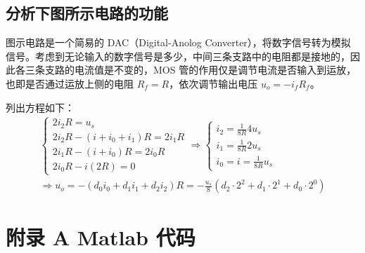 \documentclass[UTF8]{report}
\theoremstyle{MyLineTheoremStyle} %
\theoremstyle{MyBlockTheoremStyle} %
\theoremstyle{MySubsubsectionStyle} %
\begin{document}
\section{分析下图所示电路的功能}
图示电路是一个简易的 DAC（Digital-Anolog Converter），将数字信号转为模拟信号。考虑到无论输入的数字信号是多少，中间三条支路中的电阻都是接地的，因此各三条支路的电流值是不变的，MOS 管的作用仅是调节电流是否输入到运放，也即是否通过运放上侧的电阻 $R_f = R$，依次调节输出电压 $u_o = -i_fR_f$。

列出方程如下：
\begin{gather}
\begin{cases}
    2i_2R = u_s \\ 
    2i_2R - (i + i_0 + i_1)R = 2i_1R \\ 
    2i_1R - (i + i_0 )R = 2i_0R \\ 
    2i_0R - i(2R) = 0
\end{cases}
\Longrightarrow 
\begin{cases}
    i_2 = \frac{1}{8R} 4u_s \\ 
    i_1 = \frac{1}{8R} 2u_s \\ 
    i_0 = i = \frac{1}{8R} u_s
\end{cases} \\ 
\Longrightarrow 
u_o = - (d_0i_0 + d_1i_1 + d_2i_2)R = -\frac{u_s}{8}\left( d_2\cdot 2^2 + d_1\cdot 2^1 + d_0\cdot 2^0 \right)
\end{gather}





\newpage
\appendix
\titleformat{\chapter}[hang]{\normalfont\huge\bfseries\centering}{}{20pt}{}
\titlespacing*{\chapter}{0pt}{-25pt}{8pt} %
\titleformat{\section}[hang]{\normalfont\centering\Large\bfseries  }{\thesection}{8pt}{}


\chapter*{附录 A\hspace*{20pt}  Matlab 代码}\setcounter{chapter}{1} 
\setcounter{equation}{0}    %
\thispagestyle{fancy} 
\setcounter{section}{0}   
\renewcommand\thesection{A.\arabic{section}}   
\renewcommand{\thefigure}{A.\arabic{figure}} 
\renewcommand{\thetable}{A.\arabic{table}}
\end{document}
